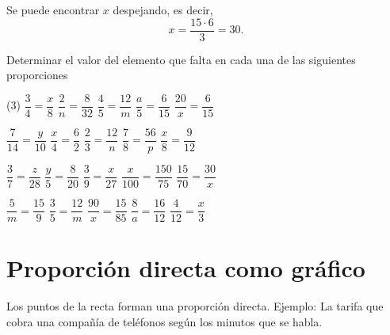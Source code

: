 \documentclass[]{plantilla-material-v1}
\begin{document}
Se puede encontrar $x$ despejando, es decir,
\begin{equation*}
  x = \dfrac{15\cdot 6}{3} = 30.
\end{equation*}

Determinar el valor del elemento que falta en cada una de las siguientes proporciones
\begin{ejercicios}[resume,after-item-skip=10pt](3)
  \ejercicio $\dfrac{3}{4}=\dfrac{x}{8}$ 
  \ejercicio $\dfrac{2}{n}=\dfrac{8}{32}$ 
  \ejercicio $\dfrac{4}{5}=\dfrac{12}{m}$ 
  \ejercicio $\dfrac{a}{5}=\dfrac{6}{15}$ 
  \ejercicio $\dfrac{20}{x}=\dfrac{6}{15}$ 

  \ejercicio $\dfrac{7}{14}=\dfrac{y}{10}$ 
  \ejercicio $\dfrac{x}{4}=\dfrac{6}{2}$ 
  \ejercicio $\dfrac{2}{3}=\dfrac{12}{n}$ 
  \ejercicio $\dfrac{7}{8}=\dfrac{56}{p}$ 
  \ejercicio $\dfrac{x}{8}=\dfrac{9}{12}$ 

  \ejercicio $\dfrac{3}{7}=\dfrac{z}{28}$ 
  \ejercicio $\dfrac{y}{5}=\dfrac{8}{20}$ 
  \ejercicio $\dfrac{3}{9}=\dfrac{x}{27}$ 
  \ejercicio $\dfrac{x}{100}=\dfrac{150}{75}$ 
  \ejercicio $\dfrac{15}{70}=\dfrac{30}{x}$ 

  \ejercicio $\dfrac{5}{m}=\dfrac{15}{9}$ 
  \ejercicio $\dfrac{3}{5}=\dfrac{12}{m}$ 
  \ejercicio $\dfrac{90}{x}=\dfrac{15}{85}$ 
  \ejercicio $\dfrac{8}{a}=\dfrac{16}{12}$ 
  \ejercicio $\dfrac{4}{12}=\dfrac{x}{3}$ 
\end{ejercicios}

\section{Proporción directa como gráfico}

\begin{importante}
  Los puntos de la recta forman una proporción directa. Ejemplo: La tarifa que cobra 
una compañía de teléfonos según los minutos que se habla.
\end{importante}
\end{document}
